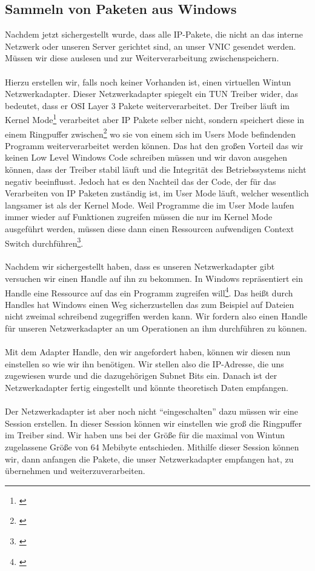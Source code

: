 \subsection{Sammeln von Paketen aus Windows}
Nachdem jetzt sichergestellt wurde, dass alle IP-Pakete, die nicht an das interne Netzwerk oder unseren Server gerichtet sind, an unser VNIC gesendet werden. Müssen wir diese auslesen und zur Weiterverarbeitung zwischenspeichern.
\\\\
Hierzu erstellen wir, falls noch keiner Vorhanden ist, einen virtuellen Wintun Netzwerkadapter. Dieser Netzwerkadapter spiegelt ein TUN Treiber wider, das bedeutet, dass er OSI Layer 3 Pakete weiterverarbeitet. Der Treiber läuft im Kernel Mode\footnote[1]{\cite[Vgl.][]{12}} verarbeitet aber IP Pakete selber nicht, sondern speichert diese in einem Ringpuffer zwischen\footnote[2]{\cite[Vgl.][]{11}} wo sie von einem sich im Users Mode befindenden Programm weiterverarbeitet werden können. Das hat den großen Vorteil das wir keinen Low Level Windows Code schreiben müssen und wir davon ausgehen können, dass der Treiber stabil läuft und die Integrität des Betriebssystems nicht negativ beeinflusst. Jedoch hat es den Nachteil das der Code, der für das Verarbeiten von IP Paketen zuständig ist, im User Mode läuft, welcher wesentlich langsamer ist als der Kernel Mode. Weil Programme die im User Mode laufen immer wieder auf Funktionen zugreifen müssen die nur im Kernel Mode ausgeführt werden, müssen diese dann einen Ressourcen aufwendigen Context Switch durchführen\footnote[3]{\cite[Vgl.][]{13}}.
\\\\
Nachdem wir sichergestellt haben, dass es unseren Netzwerkadapter gibt versuchen wir einen Handle auf ihn zu bekommen. In Windows repräsentiert ein Handle eine Ressource auf das ein Programm zugreifen will\footnote[4]{\cite[Vgl.][]{14}}. Das heißt durch Handles hat Windows einen Weg sicherzustellen das zum Beispiel auf Dateien nicht zweimal schreibend zugegriffen werden kann. Wir fordern also einen Handle für unseren Netzwerkadapter an um Operationen an ihm durchführen zu können.
\\\\
Mit dem Adapter Handle, den wir angefordert haben, können wir diesen nun einstellen so wie wir ihn benötigen. Wir stellen also die IP-Adresse, die uns zugewiesen wurde und die dazugehörigen Subnet Bits ein. Danach ist der Netzwerkadapter fertig eingestellt und könnte theoretisch Daten empfangen.
\\\\
Der Netzwerkadapter ist aber noch nicht “eingeschalten” dazu müssen wir eine Session erstellen. In dieser Session können wir einstellen wie groß die Ringpuffer im Treiber sind. Wir haben uns bei der Größe für die maximal von Wintun zugelassene Größe von 64 Mebibyte entschieden. Mithilfe dieser Session können wir, dann anfangen die Pakete, die unser Netzwerkadapter empfangen hat, zu übernehmen und weiterzuverarbeiten.

